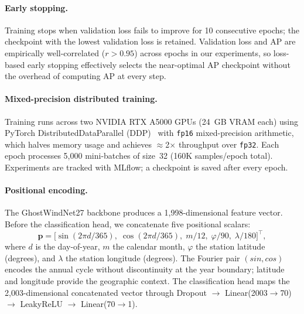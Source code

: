 \documentclass{article}
\begin{document}
\paragraph{Early stopping.}
Training stops when validation loss fails to improve for 10 consecutive epochs; the checkpoint with the lowest validation loss is retained. Validation loss and AP are empirically well-correlated ($r > 0.95$) across epochs in our experiments, so loss-based early stopping effectively selects the near-optimal AP checkpoint without the overhead of computing AP at every step.

\paragraph{Mixed-precision distributed training.}
Training runs across two NVIDIA RTX A5000 GPUs (24~GB VRAM each) using PyTorch DistributedDataParallel (DDP)~\cite{paszke2019pytorch} with \texttt{fp16} mixed-precision arithmetic, which halves memory usage and achieves $\approx$2$\times$ throughput over \texttt{fp32}. Each epoch processes 5{,}000 mini-batches of size~32 (160K samples/epoch total). Experiments are tracked with MLflow; a checkpoint is saved after every epoch.

\paragraph{Positional encoding.}
The GhostWindNet27 backbone produces a 1{,}998-dimensional feature vector. Before the classification head, we concatenate five positional scalars:
\begin{equation}
    \mathbf{p} = \bigl[\sin(2\pi d/365),\; \cos(2\pi d/365),\; m/12,\; \varphi/90,\; \lambda/180\bigr]^{\!\top},
\end{equation}
where $d$ is the day-of-year, $m$ the calendar month, $\varphi$ the station latitude (degrees), and $\lambda$ the station longitude (degrees). The Fourier pair $(sin, cos)$ encodes the annual cycle without discontinuity at the year boundary; latitude and longitude provide the geographic context. The classification head maps the 2{,}003-dimensional concatenated vector through Dropout $\to$ Linear(2003$\to$70) $\to$ LeakyReLU $\to$ Linear(70$\to$1).
\end{document}
